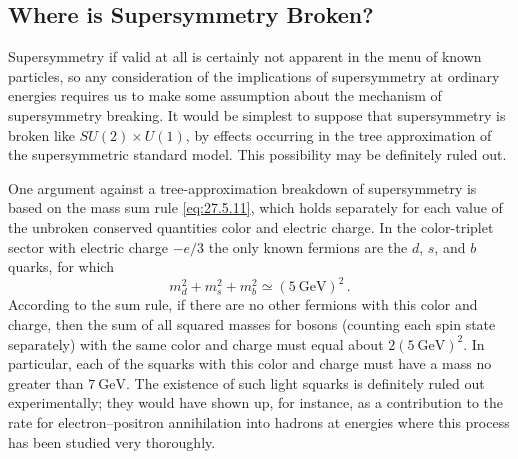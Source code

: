 
\subsection{Where is Supersymmetry Broken?}

Supersymmetry if valid at all is certainly not apparent in the menu of known
particles, so any consideration of the implications of supersymmetry at
ordinary energies requires us to make some assumption about the mechanism of
supersymmetry breaking. It would be simplest to suppose that supersymmetry
is broken like \(SU(2)\times U(1)\), by effects occurring in the tree
approximation of the supersymmetric standard model. This possibility may be
definitely ruled out.

One argument against a tree-approximation breakdown of supersymmetry is
based on the mass sum rule \eqref{eq:27.5.11}, which holds separately for
each value of the unbroken conserved quantities color and electric charge.
In the color-triplet sector with electric charge \(-e/3\) the only known
fermions are the \(d\), \(s\), and \(b\) quarks, for which
\begin{equation}
  m_d^2+m_s^2+m_b^2\simeq(5\ \mathrm{GeV})^2\,.
  \tag{28.3.1}\label{eq:28.3.1}
\end{equation}
According to the sum rule, if there are no other fermions with this color
and charge, then the sum of all squared masses for bosons (counting each
spin state separately) with the same color and charge must equal about
\(2(5\ \mathrm{GeV})^2\). In particular, each of the squarks with this
color and charge must have a mass no greater than \(7\ \mathrm{GeV}\). The
existence of such light squarks is definitely ruled out experimentally;
they would have shown up, for instance, as a contribution to the rate for
electron--positron annihilation into hadrons at energies where this process
has been studied very thoroughly.

